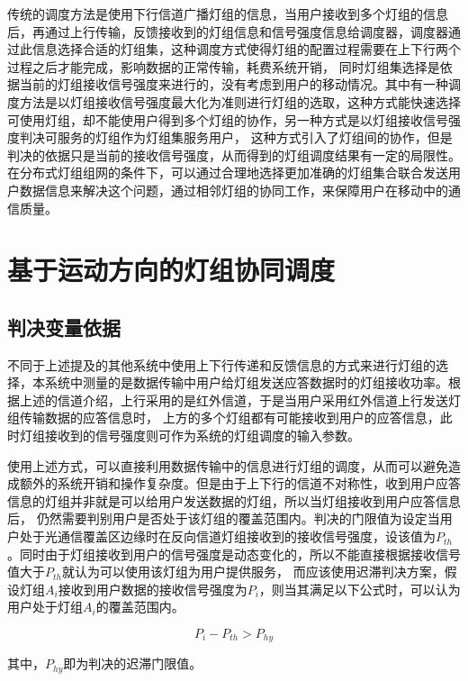 传统的调度方法是使用下行信道广播灯组的信息，当用户接收到多个灯组的信息后，再通过上行传输，反馈接收到的灯组信息和信号强度信息给调度器，调度器通过此信息选择合适的灯组集，这种调度方式使得灯组的配置过程需要在上下行两个过程之后才能完成，影响数据的正常传输，耗费系统开销，
同时灯组集选择是依据当前的灯组接收信号强度来进行的，没有考虑到用户的移动情况。其中有一种调度方法是以灯组接收信号强度最大化为准则进行灯组的选取，这种方式能快速选择可使用灯组，却不能使用户得到多个灯组的协作，另一种方式是以灯组接收信号强度判决可服务的灯组作为灯组集服务用户，
这种方式引入了灯组间的协作，但是判决的依据只是当前的接收信号强度，从而得到的灯组调度结果有一定的局限性。在分布式灯组组网的条件下，可以通过合理地选择更加准确的灯组集合联合发送用户数据信息来解决这个问题，通过相邻灯组的协同工作，来保障用户在移动中的通信质量。

\section{基于运动方向的灯组协同调度}
\subsection{判决变量依据}
不同于上述提及的其他系统中使用上下行传递和反馈信息的方式来进行灯组的选择，本系统中测量的是数据传输中用户给灯组发送应答数据时的灯组接收功率。根据上述的信道介绍，上行采用的是红外信道，于是当用户采用红外信道上行发送灯组传输数据的应答信息时，
上方的多个灯组都有可能接收到用户的应答信息，此时灯组接收到的信号强度则可作为系统的灯组调度的输入参数。

使用上述方式，可以直接利用数据传输中的信息进行灯组的调度，从而可以避免造成额外的系统开销和操作复杂度。但是由于上下行的信道不对称性，收到用户应答信息的灯组并非就是可以给用户发送数据的灯组，所以当灯组接收到用户应答信息后，
仍然需要判别用户是否处于该灯组的覆盖范围内。判决的门限值为设定当用户处于光通信覆盖区边缘时在反向信道灯组接收到的接收信号强度，设该值为$P_{th}$。同时由于灯组接收到用户的信号强度是动态变化的，所以不能直接根据接收信号值大于$P_{th}$就认为可以使用该灯组为用户提供服务，
而应该使用迟滞判决方案，假设灯组$A_{i}$接收到用户数据的接收信号强度为$P_{i}$，则当其满足以下公式时，可以认为用户处于灯组$A_{i}$的覆盖范围内。

\begin{equation}
    P_{i}-P_{th} > P_{hy}
    \label{equ:user-enter-hy}
\end{equation}

其中，$P_{hy}$即为判决的迟滞门限值。

